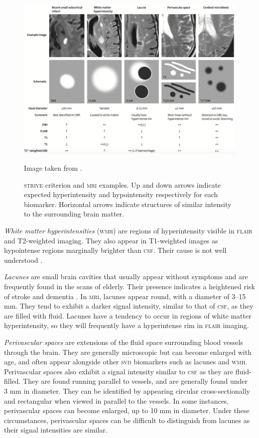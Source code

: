 \begin{figure}[ht]
	\centering
	\includegraphics[width = \textwidth]{Images/2_STRIVE.png}
	\caption{\small{\textsc{strive} criterion and \textsc{mri} examples. Up and down arrows indicate expected hyperintensity and hypointensity respectively for each biomarker. Horizontal arrows indicate structures of similar intensity to the surrounding brain matter.}}
	\small Image taken from \cite{WardlawJ.M.2013Nsfr}.
	\label{svd-biomarkers-fig}
\end{figure}

\textit{White matter hyperintensities} (\textsc{wmh}) are regions of hyperintensity visible in \textsc{flair} and T2-weighted imaging. They also appear in T1-weighted images as hypointense regions marginally brighter than \textsc{csf}. Their cause is not well understood \citep{Gouw2011}.

\textit{Lacunes} are small brain cavities that usually appear without symptoms and are frequently found in the scans of elderly. Their presence indicates a heightened risk of stroke and dementia \citep{BenjaminJ.Philip2018LIbN, VanDerFlierM.Wiesje2005SVDa}. In \textsc{mri}, lacunes appear round, with a diameter of 3--15 mm. They tend to exhibit a darker signal intensity, similar to that of \textsc{csf}, as they are filled with fluid. Lacunes have a tendency to occur in regions of white matter hyperintensity, so they will frequently have a hyperintense rim in \textsc{flair} imaging.

\textit{Perivascular spaces} are extensions of the fluid space surrounding blood vessels through the brain. They are generally microscopic but can become enlarged with age, and often appear alongside other \textsc{svd} biomarkers such as lacunes and \textsc{wmh}. Perivascular spaces also exhibit a signal intensity similar to \textsc{csf} as they are fluid-filled. They are found running parallel to vessels, and are generally found under ${\text{3 mm}}$ in diameter. They can be identified by appearing circular cross-sectionally and rectangular when viewed in parallel to the vessels. In some instances, perivascular spaces can become enlarged, up to 10 mm in diameter. Under these circumstances, perivascular spaces can be difficult to distinguish from lacunes as their signal intensities are similar.


